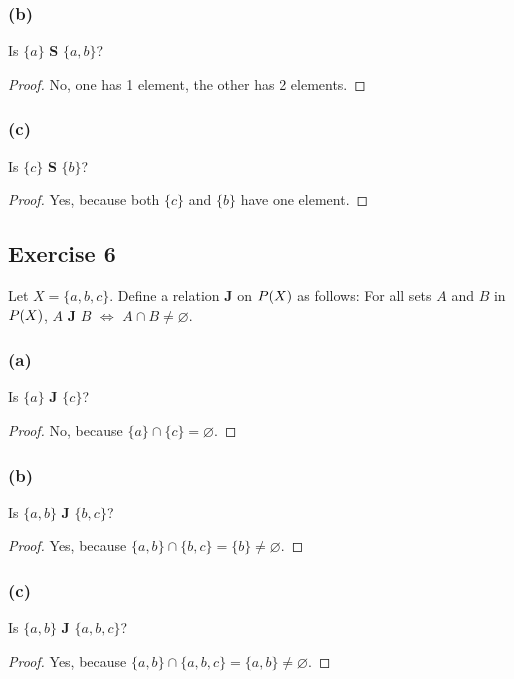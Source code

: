 \documentclass[14pt]{extarticle}
\let\mathscr\relax
\newcommand{\ps}{\mathscr{P}} %
\newcommand{\es}{\varnothing}
\begin{document}
\subsubsection{(b)}
Is \(\{a\}\) {\bf S} \(\{a,b\}\)?

\begin{proof}
No, one has 1 element, the other has 2 elements.
\end{proof}

\subsubsection{(c)}
Is \(\{c\}\) {\bf S} \(\{b\}\)?

\begin{proof}
Yes, because both \(\{c\}\) and \(\{b\}\) have one element.
\end{proof}

\subsection{Exercise 6}
Let \(X = \{a, b, c\}\). Define a relation {\bf J} on \(\ps(X)\) as follows: For all sets $A$ and $B$ in $\ps(X)$,
$A$ {\bf J} $B$ $\iff$ \(A \cap B \neq \es\).

\subsubsection{(a)}
Is $\{a\}$ {\bf J} $\{c\}$?

\begin{proof}
No, because \(\{a\} \cap \{c\} = \es\).
\end{proof}

\subsubsection{(b)}
Is $\{a, b\}$ {\bf J} $\{b, c\}$?

\begin{proof}
Yes, because \(\{a,b\} \cap \{b,c\} = \{b\} \neq \es\).
\end{proof}

\subsubsection{(c)}
Is $\{a, b\}$ {\bf J} $\{a, b, c\}$?

\begin{proof}
Yes, because \(\{a,b\} \cap \{a,b,c\} = \{a,b\} \neq \es\).
\end{proof}
\end{document}
